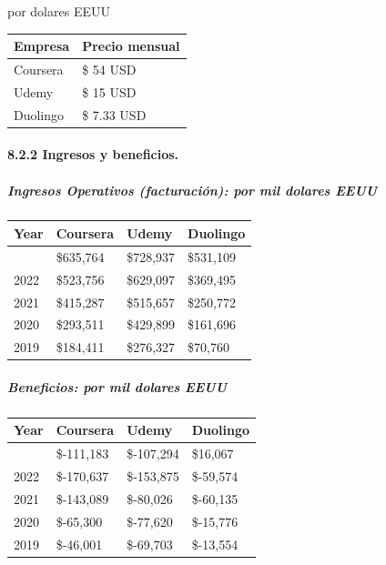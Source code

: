 \documentclass[
]{article}
\begin{document}
por dolares EEUU

\begin{longtable}[]{@{}ll@{}}
\toprule\noalign{}
Empresa & Precio mensual \\
\midrule\noalign{}
\endhead
\bottomrule\noalign{}
\endlastfoot
Coursera & \$ 54 USD \\
Udemy & \$ 15 USD \\
Duolingo & \$ 7.33 USD \\
\end{longtable}

\paragraph{8.2.2 Ingresos y beneficios.}\label{ingresos-y-beneficios.}

\subparagraph{Ingresos Operativos (facturación): por mil dolares
EEUU}\label{ingresos-operativos-facturaciuxf3n-por-mil-dolares-eeuu}

\begin{longtable}[]{@{}llll@{}}
\toprule\noalign{}
Year & Coursera & Udemy & Duolingo \\
\midrule\noalign{}
\endhead
\bottomrule\noalign{}
\endlastfoot
2023 & \$635,764 & \$728,937 & \$531,109 \\
2022 & \$523,756 & \$629,097 & \$369,495 \\
2021 & \$415,287 & \$515,657 & \$250,772 \\
2020 & \$293,511 & \$429,899 & \$161,696 \\
2019 & \$184,411 & \$276,327 & \$70,760 \\
\end{longtable}

\subparagraph{Beneficios: por mil dolares
EEUU}\label{beneficios-por-mil-dolares-eeuu}

\begin{longtable}[]{@{}llll@{}}
\toprule\noalign{}
Year & Coursera & Udemy & Duolingo \\
\midrule\noalign{}
\endhead
\bottomrule\noalign{}
\endlastfoot
2023 & \$-111,183 & \$-107,294 & \$16,067 \\
2022 & \$-170,637 & \$-153,875 & \$-59,574 \\
2021 & \$-143,089 & \$-80,026 & \$-60,135 \\
2020 & \$-65,300 & \$-77,620 & \$-15,776 \\
2019 & \$-46,001 & \$-69,703 & \$-13,554 \\
\end{longtable}
\end{document}
